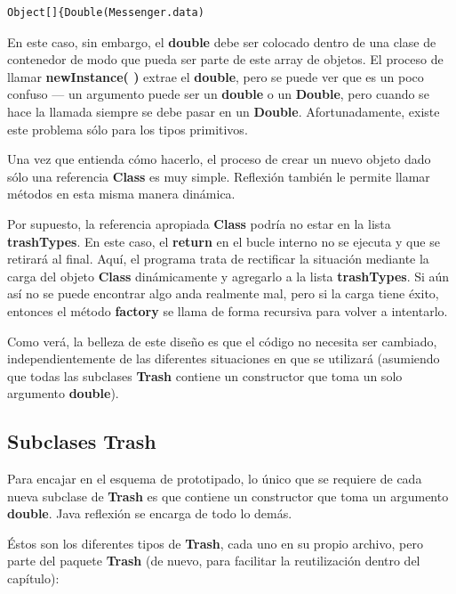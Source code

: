\documentclass{article}
\begin{document}
\begin{lstlisting} 
Object[]{Double(Messenger.data)
\end{lstlisting}

En este caso, sin embargo, el \textbf{double} debe ser colocado dentro de una clase de contenedor de modo que pueda ser parte de este array de objetos. El proceso de llamar \textbf{newInstance( )} extrae el \textbf{double}, pero se puede ver que es un poco confuso — un argumento puede ser un \textbf{double} o un \textbf{Double}, pero cuando se hace la llamada siempre se debe pasar en un \textbf{Double}. Afortunadamente, existe este problema sólo para los tipos primitivos.   \newline

Una vez que entienda cómo hacerlo, el proceso de crear un nuevo objeto dado sólo una referencia \textbf{Class} es muy simple. Reflexión también le permite llamar métodos en esta misma manera dinámica.      \newline

Por supuesto, la referencia apropiada \textbf{Class} podría no estar en la lista \textbf{trashTypes}. En este caso, el \textbf{return} en el bucle interno no se ejecuta y que se retirará al final. Aquí, el programa trata de rectificar la situación mediante la carga del objeto \textbf{Class} dinámicamente y agregarlo a la lista \textbf{trashTypes}. Si aún así no se puede encontrar algo anda realmente mal, pero si la carga tiene éxito, entonces el método  \textbf{factory} se llama de forma recursiva para volver a intentarlo.    \newline

Como verá, la belleza de este diseño es que el código no necesita ser cambiado, independientemente de las diferentes situaciones en que se utilizará (asumiendo que todas las subclases \textbf{Trash} contiene un constructor que toma un solo argumento \textbf{double}).     \newline

\subsection{Subclases \textbf{Trash}}

Para encajar en el esquema de prototipado, lo único que se requiere de cada nueva subclase de \textbf{Trash} es que contiene un constructor que toma un argumento \textbf{double}. Java reflexión se encarga de todo lo demás.    \newline

Éstos son los diferentes tipos de \textbf{Trash}, cada uno en su propio archivo, pero parte del paquete \textbf{Trash} (de nuevo, para facilitar la reutilización dentro del capítulo):       \newline
\end{document}
